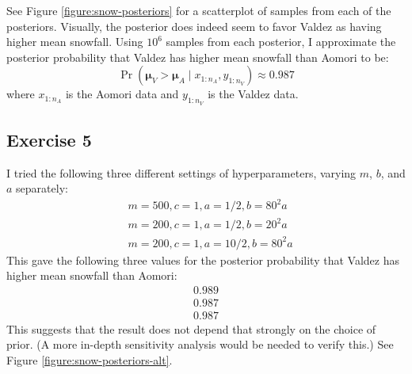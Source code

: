 \documentclass[12pt]{article}
\begin{document}
See Figure \ref{figure:snow-posteriors} for a scatterplot of samples from each of the posteriors. Visually, the posterior does indeed seem to favor Valdez as having higher mean snowfall. Using $10^6$ samples from each posterior, I approximate the posterior probability that Valdez has higher mean snowfall than Aomori to be:
$$\Pr(\bm\mu_V > \bm\mu_A\mid x_{1:n_A},y_{1:n_V}) \approx 0.987$$
where $x_{1:n_A}$ is the Aomori data and $y_{1:n_V}$ is the Valdez data.



\subsection*{Exercise 5}

I tried the following three different settings of hyperparameters, varying $m$, $b$, and $a$ separately:
\begin{align*}
 & m=500,c=1,a=1/2,b=80^2 a\\
 & m=200,c=1,a=1/2,b=20^2 a\\
 & m=200,c=1,a=10/2,b=80^2 a
\end{align*}
This gave the following three values for the posterior probability that Valdez has higher mean snowfall than Aomori:
\begin{align*}
0.989 \\
0.987 \\
0.987 
\end{align*}
This suggests that the result does not depend that strongly on the choice of prior.  (A more in-depth sensitivity analysis would be needed to verify this.) See Figure \ref{figure:snow-posteriors-alt}.
\end{document}
